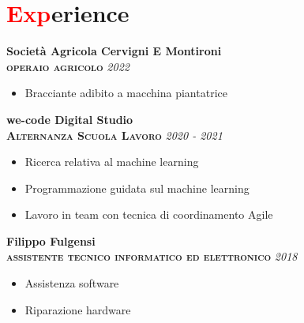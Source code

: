 \section*{\textcolor{red}{Exp}erience}
\large{\textbf{Società Agricola Cervigni E Montironi}}\\[3mm]
\textbf{\textsc{operaio agricolo}}\hfill
\textsl{2022}
\begin{itemize}
    \item Bracciante adibito a macchina piantatrice
\end{itemize}
\vskip 3mm
\large{\textbf{we-code Digital Studio}}\\[3mm]
\textbf{\textsc{Alternanza Scuola Lavoro}}\hfill
\textsl{2020 - 2021}
\begin{itemize}
    \item Ricerca relativa al machine learning
    \item Programmazione guidata sul machine learning
    \item Lavoro in team con tecnica di coordinamento Agile
\end{itemize}
\vskip 3mm
\large{\textbf{Filippo Fulgensi}}\\[3mm]
\textbf{\textsc{assistente tecnico informatico ed elettronico}}\hfill
\textsl{2018}
\begin{itemize}
    \item Assistenza software
    \item Riparazione hardware
\end{itemize}